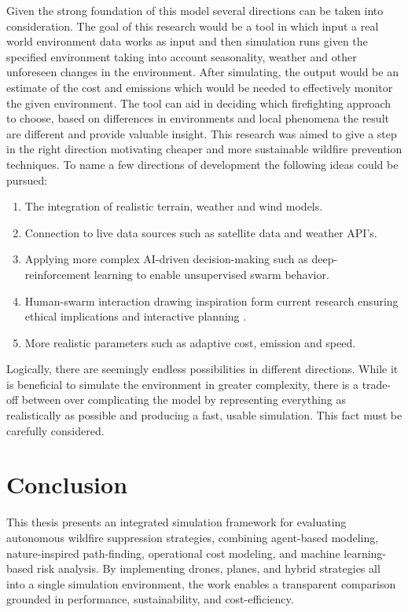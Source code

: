 \documentclass[11pt, a4paper]{article}
\begin{document}
Given the strong foundation of this model several directions can be taken into consideration. The goal of this research would be a tool in which input a real world environment data works as input and then simulation runs given the specified environment taking into account seasonality, weather and other unforeseen changes in the environment. After simulating, the output would be an estimate of the cost and emissions which would be needed to effectively monitor the given environment. The tool can aid in deciding which firefighting approach to choose, based on differences in environments and local phenomena the result are different and provide valuable insight. This research was aimed to give a step in the right direction motivating cheaper and more sustainable wildfire prevention techniques.
To name a few directions of development the following ideas could be pursued:
\begin{enumerate}
    \item The integration of realistic terrain, weather and wind models.
    \item Connection to live data sources such as satellite data and weather API's.
    \item Applying more complex AI-driven decision-making such as deep-reinforcement learning to enable unsupervised swarm behavior.
    \item Human-swarm interaction drawing inspiration form current research ensuring ethical implications and interactive planning \citep{lewisHumanFactorsIssues2012}.
    \item More realistic parameters such as adaptive cost, emission and speed.
\end{enumerate}

Logically, there are seemingly endless possibilities in different directions. While it is beneficial to simulate the environment in greater complexity, there is a trade-off between over complicating the model by representing everything as realistically as possible and producing a fast, usable simulation. This fact must be carefully considered.


\section{Conclusion}

This thesis presents an integrated simulation framework for evaluating autonomous wildfire suppression strategies, combining agent-based modeling, nature-inspired path-finding, operational cost modeling, and machine learning-based risk analysis. By implementing drones, planes, and hybrid strategies all into a single simulation environment, the work enables a transparent comparison grounded in performance, sustainability, and cost-efficiency.
\end{document}
